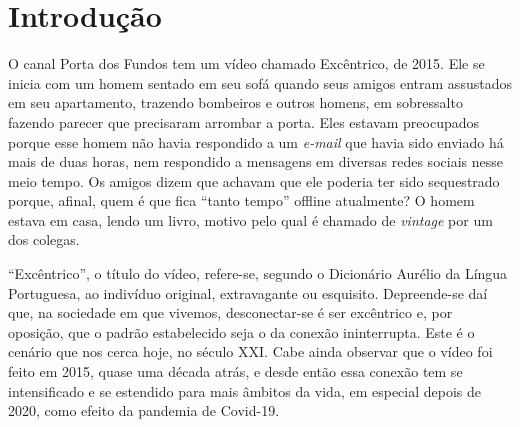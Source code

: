\section{Introdução}\label{sec-introdução}
O canal Porta dos Fundos tem um vídeo chamado Excêntrico, de 2015. Ele se inicia com um homem sentado em seu sofá quando seus amigos entram assustados em seu apartamento, trazendo bombeiros e outros homens, em sobressalto fazendo parecer que precisaram arrombar a porta. Eles estavam preocupados porque esse homem não havia respondido a um \textit{e-mail} que havia sido enviado há mais de duas horas, nem respondido a mensagens em diversas redes sociais nesse meio tempo. Os amigos dizem que achavam que ele poderia ter sido sequestrado porque, afinal, quem é que fica \enquote{tanto tempo} offline atualmente? O homem estava em casa, lendo um livro, motivo pelo qual é chamado de \textit{vintage} por um dos colegas. 

\enquote{Excêntrico}, o título do vídeo, refere-se, segundo o Dicionário Aurélio da Língua Portuguesa, ao indivíduo original, extravagante ou esquisito. Depreende-se daí que, na sociedade em que vivemos, desconectar-se é ser excêntrico e, por oposição, que o padrão estabelecido seja o da conexão ininterrupta. Este é o cenário que nos cerca hoje, no século XXI. Cabe ainda observar que o vídeo foi feito em 2015, quase uma década atrás, e desde então essa conexão tem se intensificado e se estendido para mais âmbitos da vida, em especial depois de 2020, como efeito da pandemia de Covid-19.
